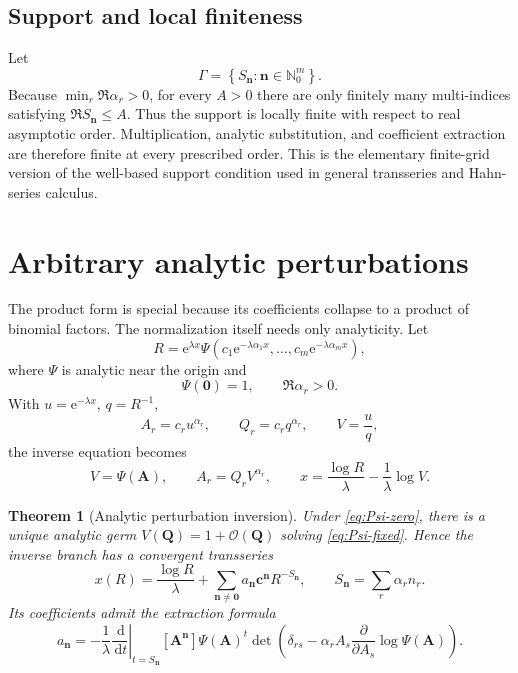 \documentclass[11pt,oneside]{article}
\numberwithin{equation}{section}
\theoremstyle{plain}
\newtheorem{theorem}{Theorem}[section]
\theoremstyle{definition}
\theoremstyle{remark}
\newcommand{\e}{\mathrm e}
\newcommand{\dd}{\,\mathrm d}
\newcommand{\Ord}{\mathcal O}
\newcommand{\multi}[1]{\bm{#1}}
\newcommand{\Nzero}{\mathbb N_0}
\begin{document}
\subsection{Support and local finiteness}

Let
\begin{equation}\label{eq:Gamma-support}
 \Gamma=\left\{
 S_{\multi n}:\multi n\in\Nzero^m
 \right\}.
\end{equation}
Because \(\min_r\Re\alpha_r>0\), for every \(A>0\) there are only finitely
many multi-indices satisfying \(\Re S_{\multi n}\le A\).  Thus the support
is locally finite with respect to real asymptotic order.  Multiplication,
analytic substitution, and coefficient extraction are therefore finite at
every prescribed order.  This is the elementary finite-grid version of the
well-based support condition used in general transseries and Hahn-series
calculus.

\section{Arbitrary analytic perturbations}\label{sec:analytic-perturbations}

The product form is special because its coefficients collapse to a product
of binomial factors.  The normalization itself needs only analyticity.
Let
\begin{equation}\label{eq:Psi-map}
 R=\e^{\lambda x}
 \Psi\!\left(
 c_1\e^{-\lambda\alpha_1x},\ldots,
 c_m\e^{-\lambda\alpha_mx}
 \right),
\end{equation}
where \(\Psi\) is analytic near the origin and
\begin{equation}\label{eq:Psi-zero}
 \Psi(\multi0)=1,
 \qquad \Re\alpha_r>0.
\end{equation}
With \(u=\e^{-\lambda x}\), \(q=R^{-1}\),
\[
 A_r=c_ru^{\alpha_r},
 \qquad Q_r=c_rq^{\alpha_r},
 \qquad V=\frac uq,
\]
the inverse equation becomes
\begin{equation}\label{eq:Psi-fixed}
 V=\Psi(\multi A),
 \qquad
 A_r=Q_rV^{\alpha_r},
 \qquad
 x=\frac{\log R}{\lambda}-\frac1\lambda\log V.
\end{equation}

\begin{theorem}[Analytic perturbation inversion]\label{thm:Psi-inversion}
Under \cref{eq:Psi-zero}, there is a unique analytic germ
\(V(\multi Q)=1+\Ord(\multi Q)\) solving \cref{eq:Psi-fixed}.  Hence the
inverse branch has a convergent transseries
\begin{equation}\label{eq:Psi-inverse-series}
 x(R)=\frac{\log R}{\lambda}
 +\sum_{\multi n\ne\multi0}a_{\multi n}
 \multi c^{\multi n}R^{-S_{\multi n}},
 \qquad S_{\multi n}=\sum_r\alpha_rn_r.
\end{equation}
Its coefficients admit the extraction formula
\begin{equation}\label{eq:Psi-coeff-formula}
 \boxed{
 a_{\multi n}= -\frac1\lambda
 \left.\frac{\dd}{\dd t}\right|_{t=S_{\multi n}}
 [\multi A^{\multi n}]
 \Psi(\multi A)^t
 \det\!\left(
  \delta_{rs}-\alpha_rA_s\frac{\partial}{\partial A_s}
                    \log\Psi(\multi A)
 \right).
 }
\end{equation}
\end{theorem}
\end{document}
